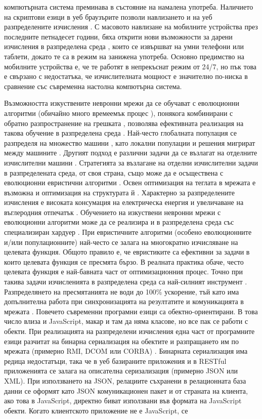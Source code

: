 компютърната система преминава в състояние на намалена употреба. Наличието на скриптови езици \cite{Rivas-01} в уеб браузърите позволи навлизането и на уеб разпределените изчисления \cite{Duda-01}. С масовото навлизане на мобилните устройства през последните петнадесет години, бяха открити нови възможности за дарени изчисления в разпределена среда \cite{Gong-01}, които се извършват на умни телефони или таблети, докато те са в режим на занижена употреба. Основно предимство на мобилните устройства е, че те работят в непрекъснат режим от 24/7, но пък това е свързано с недостатъка, че изчислителната мощност е значително по-ниска в сравнение със съвременна настолна компютърна система. 

Възможността изкуствените невронни мрежи да се обучават с еволюционни алгоритми \cite{Desell-03} (обичайно много времеемък процес \cite{Guo-01}), понякога комбинирани с обратно разпространение на грешката \cite{Zhu-01}, позволява ефективната реализация на такова обучение в разпределена среда \cite{Pandey-01}. Най-често глобалната популация се разпределя на множество машини \cite{Plagianakos-01}, като локални популации и решения мигрират между машините \cite{Tan-01}. Другият подход е различни задачи да се възлагат на отделните изчислителни машини \cite{Altinoz-01}. Стратегията за възлагане на отделни изчислителни задачи \cite{Ahmad-01} в разпределената среда, от своя страна, също може да е осъществена с еволюционни евристични алгоритми \cite{Sharma-01}. Освен оптимизация на теглата в мрежата е възможна и оптимизация на структурата й \cite{Desell-01}. Характерно за разпределените изчисления е високата консумация на електрическа енергия \cite{Foo-01} и увеличаване на въглеродния отпечатък \cite{Kumar-01}. Обучението на изкуствени невронни мрежи с еволюционни алгоритми може да се реализира и в разпределена среда със специализиран хардуер \cite{Epitropakis-01}. При евристичните алгоритми (особено еволюционните и/или популационните) най-често се залага на многократно изчисляване на целевата функция. Общото правило е, че евристиките са ефективни за задачи в които целевата функция се пресмята бързо. В реалната практика обаче, често целевата функция е най-бавната част от оптимизационния процес. Точно при такива задачи изчисленията в разпределена среда са най-силният инструмент \cite{Liu-01}. Разпределянето на пресмятанията не води до 100\% ускорение, тъй като има допълнителна работа при синхронизацията на резултатите и комуникацията в мрежата \cite{Gong-01}. Повечето съвременни програмни езици са обектно-ориентирани. В това число влиза и JavaScript, макар и там да няма класове, но все пак се работи с обекти. При реализацията на разпределени изчисления една част от програмните езици разчитат на бинарна сериализация на обектите и разпращането им по мрежата (примерно RMI, DCOM или CORBA) \cite{Ding-02}. Бинарната сериализация има редица недостатъци, така че в уеб базираните приложения и в RESTful приложенията се залага на описателна серизализация (примерно JSON или XML). При използването на JSON, релациите съхранени в релационната база данни се оформят като JSON комуникационен пакет и от страната на клиента, ако това в JavaScript, директно биват използвани във формата на JavaScript обекти. Когато клиентското приложение не е JavaScript, се 